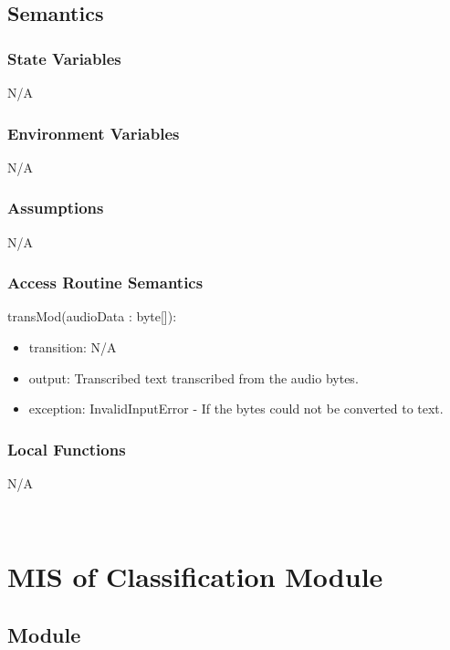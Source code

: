 \documentclass[12pt, titlepage]{article}
\begin{document}
\subsection{Semantics}

\subsubsection{State Variables}

N/A

\subsubsection{Environment Variables}

N/A

\subsubsection{Assumptions}

N/A

\subsubsection{Access Routine Semantics}

\noindent transMod(audioData : byte[]): 
\begin{itemize}
  \item transition: N/A
  \item output: Transcribed text transcribed from the audio bytes. 
  \item exception: InvalidInputError - If the bytes could not be converted to text. 
\end{itemize}

\subsubsection{Local Functions}

N/A

~\newpage
  
\section{MIS of Classification Module} \label{Classification_Module} 

\subsection{Module}
\end{document}
